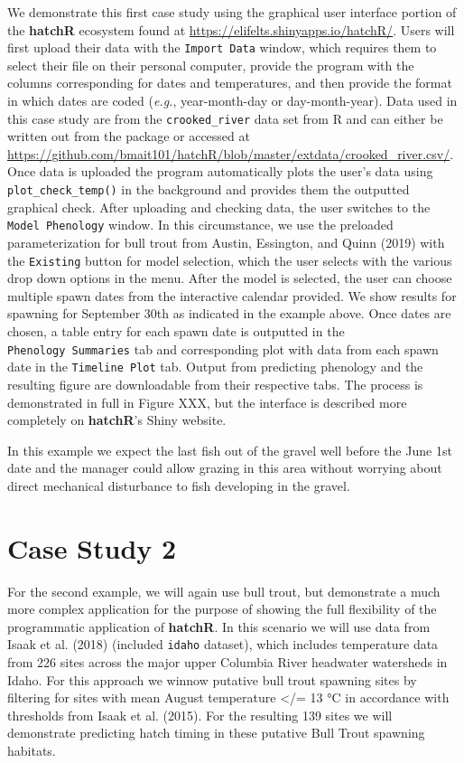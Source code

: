 \documentclass[webpdf,large,contemporary,namedate]{oup-authoring-template}
\theoremstyle{thmstyleone}
\theoremstyle{thmstyletwo}
\theoremstyle{thmstylethree}
\begin{document}
We demonstrate this first case study using the graphical user interface
portion of the \textbf{hatchR} ecosystem found at
\url{https://elifelts.shinyapps.io/hatchR/}. Users will first upload
their data with the \texttt{Import\ Data} window, which requires them to
select their file on their personal computer, provide the program with
the columns corresponding for dates and temperatures, and then provide
the format in which dates are coded (\emph{e.g.}, year-month-day or
day-month-year). Data used in this case study are from the
\texttt{crooked\_river} data set from R and can either be written out
from the package or accessed at
\url{https://github.com/bmait101/hatchR/blob/master/extdata/crooked_river.csv/}.
Once data is uploaded the program automatically plots the user's data
using \texttt{plot\_check\_temp()} in the background and provides them
the outputted graphical check. After uploading and checking data, the
user switches to the \texttt{Model\ Phenology} window. In this
circumstance, we use the preloaded parameterization for bull trout from
Austin, Essington, and Quinn (2019) with the \texttt{Existing} button
for model selection, which the user selects with the various drop down
options in the menu. After the model is selected, the user can choose
multiple spawn dates from the interactive calendar provided. We show
results for spawning for September 30th as indicated in the example
above. Once dates are chosen, a table entry for each spawn date is
outputted in the \texttt{Phenology\ Summaries} tab and corresponding
plot with data from each spawn date in the \texttt{Timeline\ Plot} tab.
Output from predicting phenology and the resulting figure are
downloadable from their respective tabs. The process is demonstrated in
full in Figure XXX, but the interface is described more completely on
\textbf{hatchR}'s Shiny website.

In this example we expect the last fish out of the gravel well before
the June 1st date and the manager could allow grazing in this area
without worrying about direct mechanical disturbance to fish developing
in the gravel.

\section{Case Study 2}\label{case-study-2}

For the second example, we will again use bull trout, but demonstrate a
much more complex application for the purpose of showing the full
flexibility of the programmatic application of \textbf{hatchR}. In this
scenario we will use data from Isaak et al. (2018) (included
\texttt{idaho} dataset), which includes temperature data from 226 sites
across the major upper Columbia River headwater watersheds in Idaho. For
this approach we winnow putative bull trout spawning sites by filtering
for sites with mean August temperature \textless/= 13 °C in accordance
with thresholds from Isaak et al. (2015). For the resulting 139 sites we
will demonstrate predicting hatch timing in these putative Bull Trout
spawning habitats.
\end{document}
